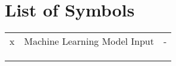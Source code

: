 \chapter*{List of Symbols}

\begin{table}[h!]
  \centering
  \begin{tabular}{lll}
    x & Machine Learning Model Input & - \\
    &       &   \\
    &       &   \\
    &       &
  \end{tabular}
\end{table}
